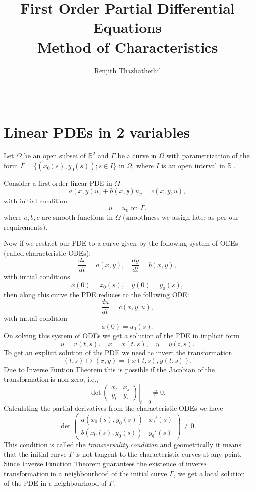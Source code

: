 \documentclass[12pt]{exam}
\title{First Order Partial Differential Equations\\Method of Characteristics}
\author{Renjith Thazhathethil}
\date{}
\begin{document}
    
    \maketitle
	\vspace{-0.5cm}
	\hrule

	\section{Linear PDEs in 2 variables}

	Let $\Omega$ be an open subset of $\mathbb{R}^2$ and $\Gamma$ be a curve in $\Omega$ with parametrization of the form $\Gamma=\{(x_0(s),y_0(s));s\in I\}$ in $\Omega$, where $I$ is an open interval in $\mathbb{R}$ . 
	
	Consider a first order linear PDE in $\Omega$
	\[a(x,y)u_x + b(x,y)u_y = c(x,y,u),\]
	with initial condition
	\[u=u_0 \text{ on } \Gamma.\]
	where \( a, b, c \) are smooth functions in $\Omega$ (smoothness we assign later as per our requirements).
	
	Now if we restrict our PDE to a curve given by the following system of ODEs (called characteristic ODEs): 
	\[\frac{dx}{dt} = a(x,y), \quad \frac{dy}{dt} = b(x,y),\]
	with initial conditions
	\[x(0) = x_0(s), \quad y(0) = y_0(s),\]
	then along this curve the PDE reduces to the following ODE:
	\[\frac{du}{dt} = c(x,y,u),\]
	with initial condition
	\[u(0) = u_0(s).\]
	On solving this system of ODEs we get a solution of the PDE in implicit form
	\[u = u(t,s), \quad x = x(t,s), \quad y = y(t,s).\]
	To get an explicit solution of the PDE we need to invert the transformation
	\[(t,s) \mapsto (x,y) = (x(t,s), y(t,s)).\]
	Due to Inverse Funtion Theorem this is possible if the Jacobian of the transformation is non-zero, i.e.,
	\[\det \left.\begin{pmatrix}
		x_t & x_s \\
		y_t & y_s
		\end{pmatrix}\right|_{t=0} \neq 0.\]
	Calculating the partial derivatives from the characteristic ODEs we have
	\[\det \begin{pmatrix}
		a(x_0(s),y_0(s)) & x_0'(s) \\
		b(x_0(s),y_0(s)) & y_0'(s)
		\end{pmatrix} \neq 0.\]
	This condition is called the \textit{transversality condition} and geometrically it means that the initial curve $\Gamma$ is not tangent to the characteristic curves at any point. Since Inverse Function Theorem guarantees the existence of inverse transformation in a neighbourhood of the initial curve $\Gamma$, we get a local solution of the PDE in a neighbourhood of $\Gamma$.
\end{document}
